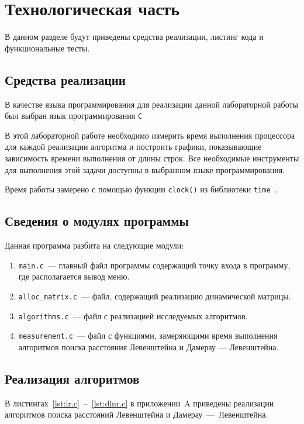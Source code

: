 \chapter{Технологическая часть}

В данном разделе будут приведены средства реализации, листинг кода и функциональные тесты.

\section{Средства реализации}

В качестве языка программирования для реализации данной лабораторной работы был выбран язык программирования \texttt{C}~\cite{c-lang}

В этой лабораторной работе необходимо измерить время выполнения процессора для каждой реализации алгоритма и построить графики, показывающие зависимость времени выполнения от длины строк. Все необходимые инструменты для выполнения этой задачи доступны в выбранном языке программирования.

Время работы замерено с помощью функции \texttt{clock()} из библиотеки \texttt{time}~\cite{c-lang-time}.

\section{Сведения о модулях программы}

Данная программа разбита на следующие модули:

\begin{enumerate}
	\item \texttt{main.c}~--- главный файл программы содержащий точку входа в программу, где располагается вывод меню.
	\item \texttt{alloc\_matrix.c}~--- файл, содержащий реализацию динамической матрицы.
	\item \texttt{algorithms.c}~--- файл с реализацией исследуемых алгоритмов.
	\item \texttt{measurement.c}~--- файл с функциями, замеряющими время выполнения алгоритмов поиска расстояния Левенштейна и Дамерау --- Левенштейна.  
\end{enumerate}

\section{Реализация алгоритмов}

В листингах~\ref{lst:lr.c}~--~\ref{lst:dlnr.c} в приложении~A приведены реализации алгоритмов поиска расстояний Левенштейна и Дамерау~---~Левенштейна.

